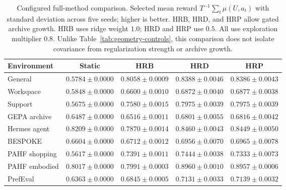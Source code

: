 \begin{table}[!htbp]
\centering
\small
\setlength{\tabcolsep}{4pt}
\caption{Configured full-method comparison. Selected mean reward $T^{-1}\sum_t\mu(U,a_t)$ with standard deviation across five seeds; higher is better. HRB, HRD, and HRP allow gated archive growth. HRB uses ridge weight $1.0$; HRD and HRP use $0.5$. All use exploration multiplier $0.8$. Unlike Table~\ref{tab:geometry-controls}, this comparison does not isolate covariance from regularization strength or archive growth.}
\label{tab:hyper-main}
\begin{tabular}{lcccc}
\toprule
Environment & Static & HRB & HRD & HRP \\
\midrule
General & $0.5784\pm0.0000$ & $0.8058\pm0.0009$ & $0.8388\pm0.0046$ & $0.8386\pm0.0043$ \\
Workspace & $0.5848\pm0.0000$ & $0.6600\pm0.0010$ & $0.6872\pm0.0040$ & $0.6877\pm0.0038$ \\
Support & $0.5675\pm0.0000$ & $0.7580\pm0.0015$ & $0.7975\pm0.0039$ & $0.7975\pm0.0039$ \\
GEPA archive & $0.6487\pm0.0000$ & $0.6516\pm0.0011$ & $0.6801\pm0.0055$ & $0.6816\pm0.0042$ \\
Hermes agent & $0.8209\pm0.0000$ & $0.7870\pm0.0014$ & $0.8460\pm0.0043$ & $0.8449\pm0.0050$ \\
BESPOKE & $0.6604\pm0.0000$ & $0.6712\pm0.0012$ & $0.6956\pm0.0070$ & $0.6965\pm0.0078$ \\
PAHF shopping & $0.5617\pm0.0000$ & $0.7391\pm0.0011$ & $0.7444\pm0.0038$ & $0.7333\pm0.0073$ \\
PAHF embodied & $0.8017\pm0.0000$ & $0.7991\pm0.0003$ & $0.8960\pm0.0010$ & $0.8957\pm0.0006$ \\
PrefEval & $0.6363\pm0.0000$ & $0.6845\pm0.0005$ & $0.7131\pm0.0033$ & $0.7139\pm0.0032$ \\
\bottomrule
\end{tabular}
\end{table}
